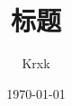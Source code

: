 \documentclass{article}
\begin{document}
\title{标题}
\author{Krxk}
\date{\today}
\maketitle
\newpage
\tableofcontents
\newpage



\end{document}
